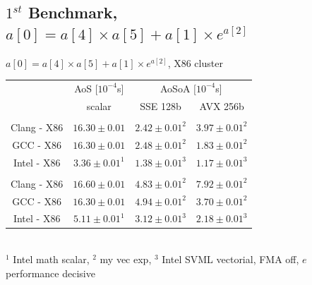 \documentclass{beamer}
\begin{document}
\subsection*{$1^{st}$ Benchmark, $a[0] = a[4] \times a[5] + a[1] \times e^{a[2]}$}
\begin{frame}[fragile]
\begin{center}
$a[0] = a[4] \times a[5] + a[1] \times e^{a[2]}$, X86 cluster
\end{center}
\centering
\begin{tabular}{ c |  c  | c c }
     & AoS  $[10^{-4}$s]& \multicolumn{2}{c}{AoSoA $[10^{-4}$s]}\\
                        & scalar & SSE 128b & AVX 256b\\
                        \hline
   \color{C0}{float}      &  & & \\
   Clang - X86 & $ 16.30\pm0.01$ &\cellcolor{C2}$2.42\pm0.01^2$ & $3.97\pm0.01^2$\\
   GCC - X86  & $16.30\pm0.01$   & $2.48\pm0.01^2$ & \cellcolor{C2}$1.83\pm0.01^2$ \\
   Intel - X86   & $3.36\pm0.01^1$   & $1.38\pm0.01^3$ & \cellcolor{C2}$1.17\pm0.01^3$\\
   \hline
   \color{C0}{double}      &   & & \\
   Clang - X86 & $16.60\pm0.01$ & $4.83\pm0.01^2$ & \cellcolor{C2}$7.92\pm0.01^2$\\
   GCC - X86  & $16.30\pm0.01$   & $4.94\pm0.01^2$ & \cellcolor{C2}$3.70\pm0.01^2$ \\
   Intel - X86   & $5.11\pm 0.01^1$ & $3.12\pm0.01^3$ & \cellcolor{C2}$2.18\pm0.01^3$\\
   \hline
\end{tabular}\\
\vspace{0.5cm}
$^1$ Intel math scalar, $^2$ my vec exp,  $^3$ Intel SVML vectorial,  FMA off, $e$ performance decisive 
\end{frame}
\end{document}
